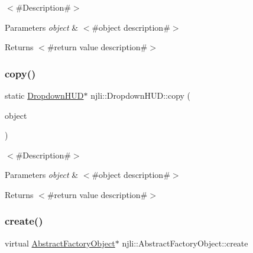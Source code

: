 $<$\#\+Description\#$>$


\begin{DoxyParams}{Parameters}
{\em object} & $<$\#object description\#$>$\\
\hline
\end{DoxyParams}
\begin{DoxyReturn}{Returns}
$<$\#return value description\#$>$ 
\end{DoxyReturn}
\mbox{\label{classnjli_1_1_dropdown_h_u_d_a14eb934a222d965720b1e6136e811f6f}} 
\subsubsection{\texorpdfstring{copy()}{copy()}}
{\footnotesize\ttfamily static \mbox{\hyperlink{classnjli_1_1_dropdown_h_u_d}{Dropdown\+H\+UD}}$\ast$ njli\+::\+Dropdown\+H\+U\+D\+::copy (\begin{DoxyParamCaption}\item[{const \mbox{\hyperlink{classnjli_1_1_dropdown_h_u_d}{Dropdown\+H\+UD}} \&}]{object }\end{DoxyParamCaption})\hspace{0.3cm}{\ttfamily [static]}}

$<$\#\+Description\#$>$


\begin{DoxyParams}{Parameters}
{\em object} & $<$\#object description\#$>$\\
\hline
\end{DoxyParams}
\begin{DoxyReturn}{Returns}
$<$\#return value description\#$>$ 
\end{DoxyReturn}
\mbox{\label{classnjli_1_1_dropdown_h_u_d_a83a8876ae63b92804004cf3febe76573}} 
\subsubsection{\texorpdfstring{create()}{create()}\hspace{0.1cm}{\footnotesize\ttfamily [1/3]}}
{\footnotesize\ttfamily virtual \mbox{\hyperlink{classnjli_1_1_abstract_factory_object}{Abstract\+Factory\+Object}}$\ast$ njli\+::\+Abstract\+Factory\+Object\+::create}

